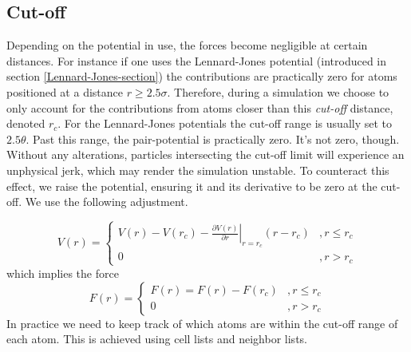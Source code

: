 \documentclass[twoside,english]{uiofysmaster}
\begin{document}
\subsection{Cut-off}
Depending on the potential in use, the forces become negligible at certain distances. 
For instance if one uses the Lennard-Jones potential (introduced in section \ref{Lennard-Jones-section}) the contributions are practically zero for atoms positioned at a distance $r\geq2.5\sigma$.
Therefore, during a simulation we choose to only account for the contributions from atoms closer than this \textit{cut-off} distance, denoted $r_c$.  
For the Lennard-Jones potentials the cut-off range is usually set to $2.5\theta$. 
Past this range, the pair-potential is practically zero. 
It's not zero, though. 
Without any alterations, particles intersecting the cut-off limit will experience an unphysical jerk, which may render the simulation unstable.  
To counteract this effect, we raise the potential, ensuring it and its derivative to be zero at the cut-off. 
We use the following adjustment.

\begin{equation}
	V(r) = 
	\begin{cases}
		\left.V(r) - V(r_c) - \frac{\partial V(r)}{\partial r}\right\rvert_{r=r_c} (r-r_c) &, r\leq r_c \\
		0 &, r>r_c 
	\end{cases}
	\label{eq:truncation}
\end{equation}
which implies the force
\begin{equation}
F(r) = 
\begin{cases}
F(r) = F(r) - F(r_c) &, r\leq r_c \\
0 &, r>r_c 
\end{cases}
\end{equation}
In practice we need to keep track of which atoms are within the cut-off range of each atom. 
This is achieved using cell lists and neighbor lists. 
\end{document}
